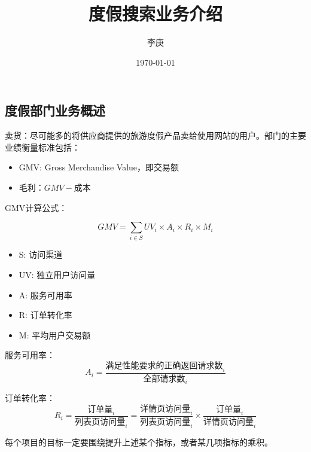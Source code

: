 \documentclass{report}
\begin{document}
\begin{CJK}{UTF8}{gbsn}

\title{度假搜索业务介绍}
\author{李庚}
\date{\today}



\maketitle
\tableofcontents
\newpage

\chapter{度假部门业务概述}

卖货：尽可能多的将供应商提供的旅游度假产品卖给使用网站的用户。部门的主要业绩衡量标准包括：

\begin{itemize}
  \item { GMV: Gross Merchandise Value，即交易额 }
  \item { 毛利：$GMV - \text{成本} $ }
\end{itemize}


GMV计算公式：

\begin{equation}
  GMV = \sum_{i \in S}{UV_i \times A_i \times R_i \times M_i}
\end{equation}

\begin{itemize}
  \item { S: 访问渠道 }
  \item { UV: 独立用户访问量 }
  \item { A: 服务可用率 }
  \item { R: 订单转化率 }
  \item { M: 平均用户交易额 }
\end{itemize}

服务可用率：
\begin{equation}
  A_i = \frac{\text{满足性能要求的正确返回请求数}_i}{\text{全部请求数}_i}
\end{equation}

订单转化率：
\begin{equation}
  R_i = \frac{\text{订单量}_i}{\text{列表页访问量}_i} = \frac{\text{详情页访问量}_i}{\text{列表页访问量}_i} \times \frac{\text{订单量}_i}{\text{详情页访问量}_i}
\end{equation}

每个项目的目标一定要围绕提升上述某个指标，或者某几项指标的乘积。


\end{CJK}
\end{document}
